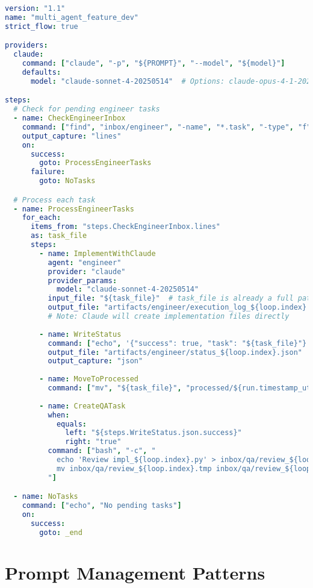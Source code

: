 \documentclass[11pt,a4paper]{article}
\begin{document}
\begin{lstlisting}[language=yaml, caption={Multi-Agent Feature Development Workflow}]
version: "1.1"
name: "multi_agent_feature_dev"
strict_flow: true

providers:
  claude:
    command: ["claude", "-p", "${PROMPT}", "--model", "${model}"]
    defaults:
      model: "claude-sonnet-4-20250514"  # Options: claude-opus-4-1-20250805

steps:
  # Check for pending engineer tasks
  - name: CheckEngineerInbox
    command: ["find", "inbox/engineer", "-name", "*.task", "-type", "f"]
    output_capture: "lines"
    on:
      success:
        goto: ProcessEngineerTasks
      failure:
        goto: NoTasks

  # Process each task
  - name: ProcessEngineerTasks
    for_each:
      items_from: "steps.CheckEngineerInbox.lines"
      as: task_file
      steps:
        - name: ImplementWithClaude
          agent: "engineer"
          provider: "claude"
          provider_params:
            model: "claude-sonnet-4-20250514"
          input_file: "${task_file}"  # task_file is already a full path from find
          output_file: "artifacts/engineer/execution_log_${loop.index}.md"
          # Note: Claude will create implementation files directly
          
        - name: WriteStatus
          command: ["echo", '{"success": true, "task": "${task_file}"}']
          output_file: "artifacts/engineer/status_${loop.index}.json"
          output_capture: "json"
          
        - name: MoveToProcessed
          command: ["mv", "${task_file}", "processed/${run.timestamp_utc}_${loop.index}/"]
          
        - name: CreateQATask
          when:
            equals:
              left: "${steps.WriteStatus.json.success}"
              right: "true"
          command: ["bash", "-c", "
            echo 'Review impl_${loop.index}.py' > inbox/qa/review_${loop.index}.tmp &&
            mv inbox/qa/review_${loop.index}.tmp inbox/qa/review_${loop.index}.task
          "]

  - name: NoTasks
    command: ["echo", "No pending tasks"]
    on:
      success:
        goto: _end
\end{lstlisting}

\section{Prompt Management Patterns}
\end{document}

